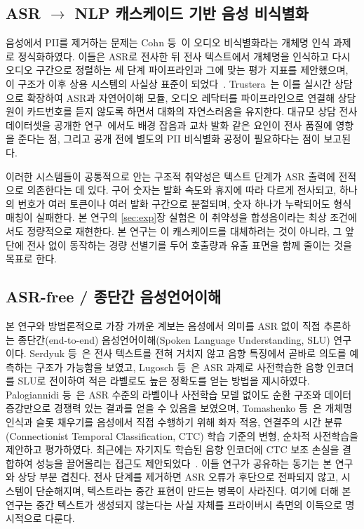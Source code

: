 \documentclass[11pt]{article}
\begin{document}
\subsection{\texorpdfstring{ASR $\rightarrow$ NLP}{ASR-NLP} 캐스케이드 기반 음성 비식별화}
음성에서 PII를 제거하는 문제는 Cohn 등~\cite{cohn2019audiodeid}이 오디오 비식별화라는 개체명
인식 과제로 정식화하였다. 이들은 ASR로 전사한 뒤 전사 텍스트에서 개체명을 인식하고 다시
오디오 구간으로 정렬하는 세 단계 파이프라인과 그에 맞는 평가 지표를 제안했으며, 이 구조가
이후 상용 시스템의 사실상 표준이 되었다~\cite{azurepii}. Trustera~\cite{gouvea2023trustera}는
이를 실시간 상담으로 확장하여 ASR과 자연어이해 모듈, 오디오 레닥터를 파이프라인으로 연결해
상담원이 카드번호를 듣지 않도록 하면서 대화의 자연스러움을 유지한다. 대규모 상담 전사
데이터셋을 공개한 연구~\cite{dao2025callcenter}에서도 배경 잡음과 교차 발화 같은 요인이 전사
품질에 영향을 준다는 점, 그리고 공개 전에 별도의 PII 비식별화 공정이 필요하다는 점이
보고된다.

이러한 시스템들이 공통적으로 안는 구조적 취약성은 텍스트 단계가 ASR 출력에 전적으로
의존한다는 데 있다. 구어 숫자는 발화 속도와 휴지에 따라 다르게 전사되고, 하나의 번호가 여러
토큰이나 여러 발화 구간으로 분절되며, 숫자 하나가 누락되어도 형식 매칭이 실패한다. 본 연구의
\ref{sec:exp}장 실험은 이 취약성을 합성음이라는 최상 조건에서도 정량적으로 재현한다. 본
연구는 이 캐스케이드를 대체하려는 것이 아니라, 그 앞단에 전사 없이 동작하는 경량 선별기를
두어 호출량과 유출 표면을 함께 줄이는 것을 목표로 한다.

\subsection{ASR-free / 종단간 음성언어이해}\label{sec:related:slu}
본 연구와 방법론적으로 가장 가까운 계보는 음성에서 의미를 ASR 없이 직접 추론하는
종단간(end-to-end) 음성언어이해(Spoken Language Understanding, SLU) 연구이다. Serdyuk
등~\cite{serdyuk2018towards}은 전사 텍스트를 전혀 거치지 않고 음향 특징에서 곧바로 의도를
예측하는 구조가 가능함을 보였고, Lugosch 등~\cite{lugosch2019pretrain}은 ASR 과제로
사전학습한 음향 인코더를 SLU로 전이하여 적은 라벨로도 높은 정확도를 얻는 방법을 제시하였다.
Palogiannidi 등~\cite{palogiannidi2020asrfree}은 ASR 수준의 라벨이나 사전학습 모델 없이도
순환 구조와 데이터 증강만으로 경쟁력 있는 결과를 얻을 수 있음을 보였으며, Tomashenko
등~\cite{tomashenko2019recent}은 개체명 인식과 슬롯 채우기를 음성에서 직접 수행하기 위해 화자
적응, 연결주의 시간 분류(Connectionist Temporal Classification, CTC) 학습 기준의 변형, 순차적
사전학습을 제안하고 평가하였다. 최근에는 자기지도 학습된 음향 인코더에 CTC 보조 손실을
결합하여 성능을 끌어올리는 접근도 제안되었다~\cite{wang2023jointctc}. 이들 연구가 공유하는
동기는 본 연구와 상당 부분 겹친다. 전사 단계를 제거하면 ASR 오류가 후단으로 전파되지 않고,
시스템이 단순해지며, 텍스트라는 중간 표현이 만드는 병목이 사라진다. 여기에 더해 본 연구는
중간 텍스트가 생성되지 않는다는 사실 자체를 프라이버시 측면의 이득으로 명시적으로 다룬다.
\end{document}
